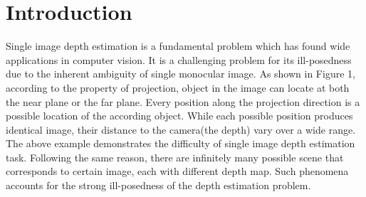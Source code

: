 \documentclass[10pt,twocolumn,letterpaper]{article}
\begin{document}
\section{Introduction}


Single image depth estimation is a fundamental problem which has found wide applications in computer vision. It is a challenging problem for its ill-posedness due to the inherent ambiguity of single monocular image. As shown in Figure 1, according to the property of projection, object in the image can locate at both the near plane or the far plane. Every position along the projection direction is a possible location of the according object. While each possible position produces identical image, their distance to the camera(the depth) vary over a wide range. The above example demonstrates the difficulty of single image depth estimation task. Following the same reason, there are infinitely many possible scene that corresponds to certain image, each with different depth map. Such phenomena accounts for the strong ill-posedness of the depth estimation problem.
\end{document}
